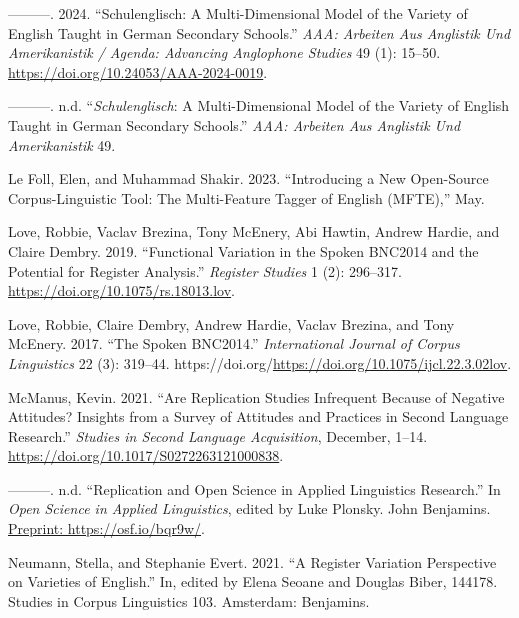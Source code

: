 \documentclass[
  letterpaper,
  DIV=11,
  numbers=noendperiod]{scrreprt}
\newlength{\cslhangindent}
\newenvironment{CSLReferences}[2] %
 {\begin{list}{}{%
  \setlength{\itemindent}{0pt}
  \setlength{\leftmargin}{0pt}
  \setlength{\parsep}{0pt}
  \ifodd #1
   \setlength{\leftmargin}{\cslhangindent}
   \setlength{\itemindent}{-1\cslhangindent}
  \fi
  \setlength{\itemsep}{#2\baselineskip}}}
 {\end{list}}
\begin{document}
\begin{CSLReferences}{1}{0}
---------. 2024. {``Schulenglisch: A Multi-Dimensional Model of the
Variety of English Taught in German Secondary Schools.''} \emph{AAA:
Arbeiten Aus Anglistik Und Amerikanistik / Agenda: Advancing Anglophone
Studies} 49 (1): 15--50. \url{https://doi.org/10.24053/AAA-2024-0019}.

---------. n.d. {``{\emph{Schulenglisch}}: A Multi-Dimensional Model of
the Variety of English Taught in German Secondary Schools.''} \emph{AAA:
Arbeiten Aus Anglistik Und Amerikanistik} 49.

Le Foll, Elen, and Muhammad Shakir. 2023. {``Introducing a New
Open-Source Corpus-Linguistic Tool: The Multi-Feature Tagger of English
(MFTE),''} May.

Love, Robbie, Vaclav Brezina, Tony McEnery, Abi Hawtin, Andrew Hardie,
and Claire Dembry. 2019. {``Functional Variation in the Spoken BNC2014
and the Potential for Register Analysis.''} \emph{Register Studies} 1
(2): 296--317. \url{https://doi.org/10.1075/rs.18013.lov}.

Love, Robbie, Claire Dembry, Andrew Hardie, Vaclav Brezina, and Tony
McEnery. 2017. {``The Spoken BNC2014.''} \emph{International Journal of
Corpus Linguistics} 22 (3): 319--44.
https://doi.org/\url{https://doi.org/10.1075/ijcl.22.3.02lov}.

McManus, Kevin. 2021. {``Are Replication Studies Infrequent Because of
Negative Attitudes? Insights from a Survey of Attitudes and Practices in
Second Language Research.''} \emph{Studies in Second Language
Acquisition}, December, 1--14.
\url{https://doi.org/10.1017/S0272263121000838}.

---------. n.d. {``Replication and Open Science in Applied Linguistics
Research.''} In \emph{Open Science in Applied Linguistics}, edited by
Luke Plonsky. John Benjamins.
\href{Preprint:\%20https://osf.io/bqr9w/}{Preprint:
https://osf.io/bqr9w/}.

Neumann, Stella, and Stephanie Evert. 2021. {``A Register Variation
Perspective on Varieties of English.''} In, edited by Elena Seoane and
Douglas Biber, 144178. Studies in Corpus Linguistics 103. Amsterdam:
Benjamins.


\end{CSLReferences}
\end{document}
